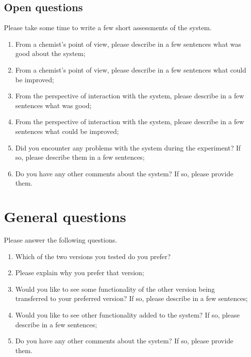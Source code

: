 \subsection*{Open questions}
Please take some time to write a few short assessments of the system.
\begin{enumerate}
\item From a chemist's point of view, please describe in a few sentences what was good about the system;
\item From a chemist's point of view, please describe in a few sentences what could be improved;
\item From the perspective of interaction with the system, please describe in a few sentences what was good;
\item From the perspective of interaction with the system, please describe in a few sentences what could be improved;
\item Did you encounter any problems with the system during the experiment? If so, please describe them in a few sentences;
\item Do you have any other comments about the system? If so, please provide them.
\end{enumerate}

\section{General questions}
Please answer the following questions.
\begin{enumerate}
\item Which of the two versions you tested do you prefer?
\item Please explain why you prefer that version;
\item Would you like to see some functionality of the other version being transferred to your preferred version? If so, please describe in a few sentences;
\item Would you like to see other functionality added to the system? If so, please describe in a few sentences;
\item Do you have any other comments about the system? If so, please provide them.
\end{enumerate}
